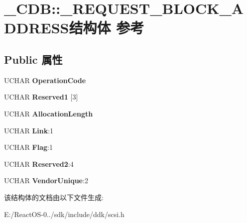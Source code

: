 \hypertarget{struct___c_d_b_1_1___r_e_q_u_e_s_t___b_l_o_c_k___a_d_d_r_e_s_s}{}\section{\+\_\+\+C\+DB\+:\+:\+\_\+\+R\+E\+Q\+U\+E\+S\+T\+\_\+\+B\+L\+O\+C\+K\+\_\+\+A\+D\+D\+R\+E\+S\+S结构体 参考}
\label{struct___c_d_b_1_1___r_e_q_u_e_s_t___b_l_o_c_k___a_d_d_r_e_s_s}
\subsection*{Public 属性}
\begin{DoxyCompactItemize}
\item 
\mbox{\label{struct___c_d_b_1_1___r_e_q_u_e_s_t___b_l_o_c_k___a_d_d_r_e_s_s_a4afa2ad8c87131a134def0e2dd9cf41f}} 
U\+C\+H\+AR {\bfseries Operation\+Code}
\item 
\mbox{\label{struct___c_d_b_1_1___r_e_q_u_e_s_t___b_l_o_c_k___a_d_d_r_e_s_s_a88838196aabf83fdee18eca4d73146ca}} 
U\+C\+H\+AR {\bfseries Reserved1} \mbox{[}3\mbox{]}
\item 
\mbox{\label{struct___c_d_b_1_1___r_e_q_u_e_s_t___b_l_o_c_k___a_d_d_r_e_s_s_a6ddcb6094a8e673f58f554eb18d042ae}} 
U\+C\+H\+AR {\bfseries Allocation\+Length}
\item 
\mbox{\label{struct___c_d_b_1_1___r_e_q_u_e_s_t___b_l_o_c_k___a_d_d_r_e_s_s_a5f8dd59de5e1406bc1f083e8bb75de6d}} 
U\+C\+H\+AR {\bfseries Link}\+:1
\item 
\mbox{\label{struct___c_d_b_1_1___r_e_q_u_e_s_t___b_l_o_c_k___a_d_d_r_e_s_s_abca48869a9fcfb90a43348c62e64a206}} 
U\+C\+H\+AR {\bfseries Flag}\+:1
\item 
\mbox{\label{struct___c_d_b_1_1___r_e_q_u_e_s_t___b_l_o_c_k___a_d_d_r_e_s_s_a983368eb1f5d457a6add9efb99aa53ae}} 
U\+C\+H\+AR {\bfseries Reserved2}\+:4
\item 
\mbox{\label{struct___c_d_b_1_1___r_e_q_u_e_s_t___b_l_o_c_k___a_d_d_r_e_s_s_a82e78c47e18a148cb1c3fb932e89ba9c}} 
U\+C\+H\+AR {\bfseries Vendor\+Unique}\+:2
\end{DoxyCompactItemize}


该结构体的文档由以下文件生成\+:\begin{DoxyCompactItemize}
\item 
E\+:/\+React\+O\+S-\/0../sdk/include/ddk/scsi.\+h\end{DoxyCompactItemize}
